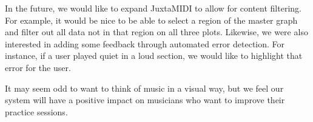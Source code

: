\documentclass[journal]{vgtc}                %
\begin{document}
In the future, we would like to expand JuxtaMIDI to allow for content filtering.
For example, it would be nice to be able to select a region of the master graph
and filter out all data not in that region on all three plots. Likewise, we
were also interested in adding some feedback through automated error detection.
For instance, if a user played quiet in a loud section, we would like to
highlight that error for the user.

It may seem odd to want to think of music in a visual way, but we feel our
system will have a positive impact on musicians who want to improve their
practice sessions.
\end{document}
